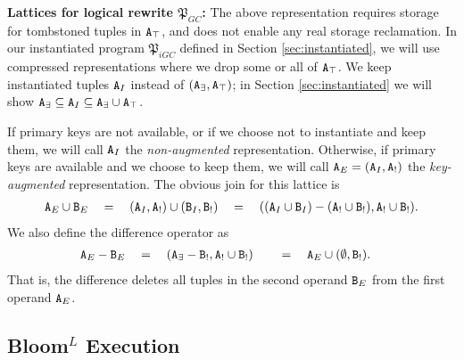 \textbf{Lattices for logical rewrite $\mathfrak{P}_{GC}$:}
The above representation requires storage for tombstoned tuples in $\tt{A}_\top$, and does not enable any real storage reclamation.
In our instantiated program $\mathfrak{P}_{iGC}$ defined in Section \ref{sec:instantiated}, we will use compressed representations where we drop some or all of $\tt{A}_\top$.
We keep instantiated tuples $\tt{A}_I$ instead of $(\tt{A}_\exists, \tt{A}_\top)$; in Section \ref{sec:instantiated} we will show $\tt{A}_\exists \subseteq \tt{A}_I \subseteq \tt{A}_\exists \cup \tt{A}_\top$.

If primary keys are not available, or if we choose not to instantiate and keep them, we will call $\tt{A}_I$ the \emph{non-augmented} representation.
Otherwise, if primary keys are available and we choose to keep them, we will call $\tt{A}_E = (\tt{A}_I, \tt{A}_!)$ the \emph{key-augmented} representation.
The obvious join for this lattice is
\begin{align*}
\tt{A}_E \cup \tt{B}_E \quad=\quad (\tt{A}_I, \tt{A}_!) \cup (\tt{B}_I, \tt{B}_!) \quad=\quad ((\tt{A}_I \cup \tt{B}_I) - (\tt{A}_! \cup \tt{B}_!), \tt{A}_! \cup \tt{B}_!).
\end{align*}
We also define the difference operator
as
\begin{align*}
\tt{A}_E - \tt{B}_E &\quad=\quad (\tt{A}_\exists - \tt{B}_!, \tt{A}_! \cup \tt{B}_!) &&\quad=\quad \tt{A}_E \cup (\emptyset, \tt{B}_!).
\end{align*}
That is, the difference deletes all tuples in the second operand $\tt{B}_E$ from the first operand $\tt{A}_E$.


\subsection{Bloom$^L$ Execution}
\label{sec:prelims:exec}

